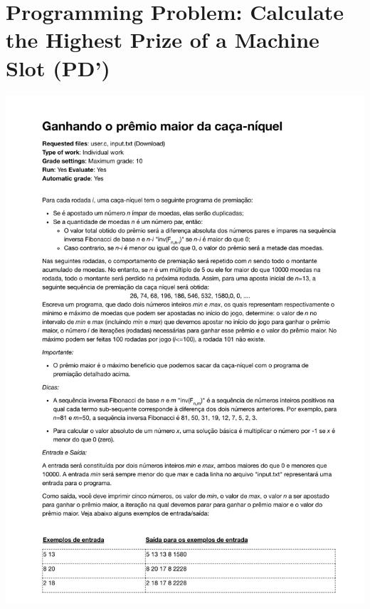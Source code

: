 \section{Programming Problem: Calculate the Highest Prize of a Machine Slot (PD')}
\label{annex:pilot-study-pD}
\includegraphics[page=1,width=1\textwidth]{images/annex/pilot-study-pD.pdf}

\newpage
